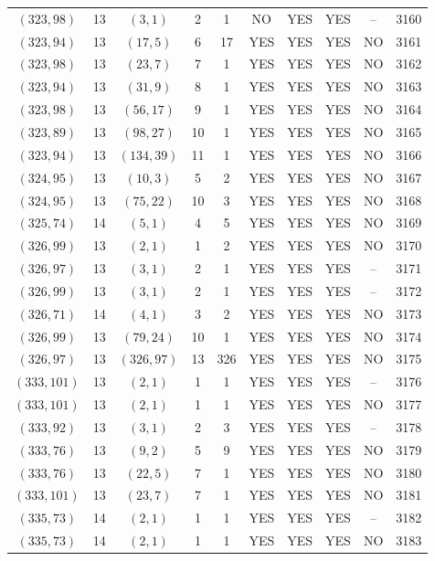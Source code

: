 \begin{longtable}{|c|c|c|c|c|c|c|c|c|c|}
$(323, 98)$ & 13 & $(3, 1)$ & 2 & 1 & NO & YES & YES & -- & 3160\\
$(323, 94)$ & 13 & $(17, 5)$ & 6 & 17 & YES & YES & YES & NO & 3161\\
$(323, 98)$ & 13 & $(23, 7)$ & 7 & 1 & YES & YES & YES & NO & 3162\\
$(323, 94)$ & 13 & $(31, 9)$ & 8 & 1 & YES & YES & YES & NO & 3163\\
$(323, 98)$ & 13 & $(56, 17)$ & 9 & 1 & YES & YES & YES & NO & 3164\\
$(323, 89)$ & 13 & $(98, 27)$ & 10 & 1 & YES & YES & YES & NO & 3165\\
$(323, 94)$ & 13 & $(134, 39)$ & 11 & 1 & YES & YES & YES & NO & 3166\\
$(324, 95)$ & 13 & $(10, 3)$ & 5 & 2 & YES & YES & YES & NO & 3167\\
$(324, 95)$ & 13 & $(75, 22)$ & 10 & 3 & YES & YES & YES & NO & 3168\\
$(325, 74)$ & 14 & $(5, 1)$ & 4 & 5 & YES & YES & YES & NO & 3169\\
$(326, 99)$ & 13 & $(2, 1)$ & 1 & 2 & YES & YES & YES & NO & 3170\\
$(326, 97)$ & 13 & $(3, 1)$ & 2 & 1 & YES & YES & YES & -- & 3171\\
$(326, 99)$ & 13 & $(3, 1)$ & 2 & 1 & YES & YES & YES & -- & 3172\\
$(326, 71)$ & 14 & $(4, 1)$ & 3 & 2 & YES & YES & YES & NO & 3173\\
$(326, 99)$ & 13 & $(79, 24)$ & 10 & 1 & YES & YES & YES & NO & 3174\\
$(326, 97)$ & 13 & $(326, 97)$ & 13 & 326 & YES & YES & YES & NO & 3175\\
$(333, 101)$ & 13 & $(2, 1)$ & 1 & 1 & YES & YES & YES & -- & 3176\\
$(333, 101)$ & 13 & $(2, 1)$ & 1 & 1 & YES & YES & YES & NO & 3177\\
$(333, 92)$ & 13 & $(3, 1)$ & 2 & 3 & YES & YES & YES & -- & 3178\\
$(333, 76)$ & 13 & $(9, 2)$ & 5 & 9 & YES & YES & YES & NO & 3179\\
$(333, 76)$ & 13 & $(22, 5)$ & 7 & 1 & YES & YES & YES & NO & 3180\\
$(333, 101)$ & 13 & $(23, 7)$ & 7 & 1 & YES & YES & YES & NO & 3181\\
$(335, 73)$ & 14 & $(2, 1)$ & 1 & 1 & YES & YES & YES & -- & 3182\\
$(335, 73)$ & 14 & $(2, 1)$ & 1 & 1 & YES & YES & YES & NO & 3183\\

\end{longtable}
